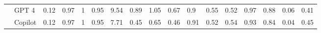 \begin{table*}[t]
{\begin{tabular}{@{}ll|llll|llll|lll|ll|ll@{}}
                           & GPT 4                & 0.12                                                                    & 0.97                                                                     & 1                                                                     & 0.95                                                                  & 9.54                                                                    & 0.89                                                                  & 1.05                                                                  & 0.67                                                                   & 0.9                                                                     & 0.55                                                                  & 0.52                                                                   & 0.97                                                                   & 0.88                                                                   & 0.06                                                                     & 0.41                                                                     \\
                           & Copilot              & 0.12                                                                    & 0.97                                                                     & 1                                                                     & 0.95                                                                  & 7.71                                                                    & 0.45                                                                  & 0.65                                                                  & 0.46                                                                   & 0.91                                                                    & 0.52                                                                  & 0.54                                                                   & 0.93                                                                   & 0.84                                                                   & 0.04                                                                     & 0.45                                                                     \\ \midrule

\end{tabular}}
\end{table*}
